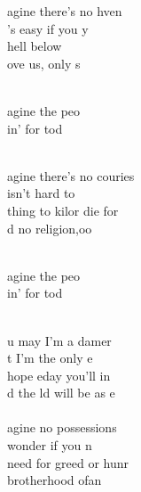 \begin{cancion}%
	agine there's no hven\\
	's easy if you y\\
	 hell below \\
	ove us, only s\\\jump\\
	\begin{chorus}%
	agine  the peo\\
	in' for tod\\
	\end{chorus}%
	\jump\\
	agine there's no couries\\
	 isn't hard to \\
	thing to kilor die for\\
	d no religion,oo\\\jump\\
	\begin{chorus}%
	agine  the peo\\
	in' for tod\\
	\end{chorus}%
	\jump\\
	u may  I'm a damer \\
	t I'm  the only e  \\
	hope eday you'll in \\
	d the ld will be as e\\
\jump\\
	agine no possessions\\
	wonder if you n\\
	 need for greed or hunr\\
	brotherhood ofan\\\jump\\

\end{cancion}
